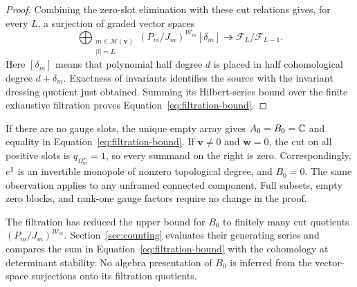 \begin{proof}
Combining the zero-slot elimination with these cut relations gives,
for every $L$, a surjection of graded vector spaces
\begin{equation}\label{eq:filtration-symbol-surjection}
 \bigoplus_{\substack{m\in\mathcal M(\mathbf v)\\|l|=L}}
 (P_m/J_m)^{\mathcal W_m}[\delta_m]
 \twoheadrightarrow \mathcal F_L/\mathcal F_{L-1}.
\end{equation}
Here $[\delta_m]$ means that polynomial half degree $d$ is placed in
half cohomological degree $d+\delta_m$.  Exactness of invariants
identifies the source with the invariant dressing quotient just
obtained.  Summing its Hilbert-series bound over the finite exhaustive
filtration proves Equation~\eqref{eq:filtration-bound}.
\end{proof}

\begin{remark}\label{rem:filtration-edge-cases}
If there are no gauge slots, the unique empty array gives
$A_0=B_0=\mathbb C$ and equality in Equation~\eqref{eq:filtration-bound}.
If $\mathbf v\ne0$ and $\mathbf w=0$, the cut on all positive slots
is $q_{\Omega_m^+}=1$, so every summand on the right is zero.
Correspondingly, $e^{\mathbf 1}$ is an invertible monopole of nonzero
topological degree, and $B_0=0$.  The same observation applies to any
unframed connected component.  Full subsets, empty zero blocks, and
rank-one gauge factors require no change in the proof.
\end{remark}

The filtration has reduced the upper bound for $B_0$ to finitely many cut
quotients $(P_m/J_m)^{\mathcal W_m}$.  Section~\ref{sec:counting} evaluates
their generating series and compares the sum in
Equation~\eqref{eq:filtration-bound} with the cohomology at determinant
stability.  No algebra presentation of $B_0$ is inferred from the
vector-space surjections onto its filtration quotients.
